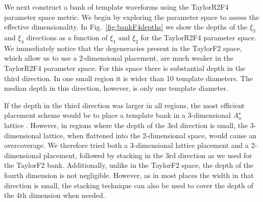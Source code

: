 We next construct a bank of template waveforms using the TaylorR2F4 parameter
space metric.
We begin by exploring the parameter space to assess the effective
dimensionality.
In Fig.~\ref{fig:bankF4depths} we show the depths of the $\xi_3$ and $\xi_4$
directions as a function of $\xi_1$ and $\xi_2$ for the TaylorR2F4 parameter
space. We immediately notice that the degeneracies present in the TaylorF2
space, which allow us to use a 2-dimensional placement,
are much weaker in the TaylorR2F4 parameter space. For this space
there is substantial depth in the third direction. In one small region it is
wider than 10 template diameters. The median depth in this direction, however,
is only one template diameter.

If the depth in the third direction was larger in all regions, the most
efficient placement scheme would be to place a template bank in a 3-dimensional
$A_n^{\star}$ lattice \cite{Conway:1993}. However, in regions where the depth of
the 3rd direction is small, the 3-dimensional lattice, when flattened into the 
2-dimensional space, would cause an overcoverage. We therefore tried both a
3-dimensional lattice placement and a 2-dimensional placement, followed
by stacking in the 3rd direction as we used for the TaylorF2 bank. Additionally,
unlike in the TaylorF2 space, the depth of the fourth dimension is not
negligible. However, as in most places the width in that direction is small, the
stacking technique can also be used to cover the depth of the 4th dimension when
needed.

